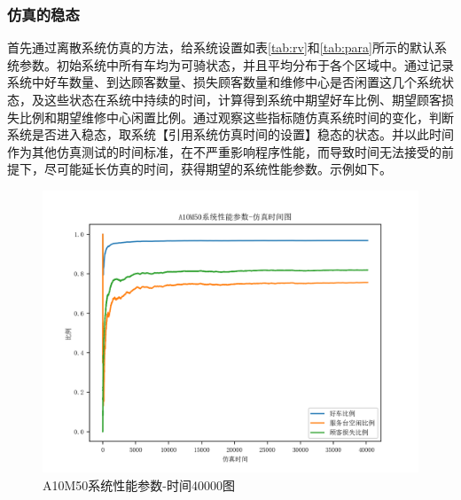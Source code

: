 \documentclass{article}
\begin{document}
\subsubsection{仿真的稳态}
首先通过离散系统仿真的方法，给系统设置如表\ref{tab:rv}和\ref{tab:para}所示的默认系统参数。初始系统中所有车均为可骑状态，并且平均分布于各个区域中。通过记录系统中好车数量、到达顾客数量、损失顾客数量和维修中心是否闲置这几个系统状态，及这些状态在系统中持续的时间，计算得到系统中期望好车比例、期望顾客损失比例和期望维修中心闲置比例。通过观察这些指标随仿真系统时间的变化，判断系统是否进入稳态，取系统【引用系统仿真时间的设置】稳态的状态。并以此时间作为其他仿真测试的时间标准，在不严重影响程序性能，而导致时间无法接受的前提下，尽可能延长仿真的时间，获得期望的系统性能参数。示例如下。
\begin{figure}[H]
    \centering
    \includegraphics[scale=0.5]{sim/A10M50系统性能参数-时间40000图.png}
    \caption{A10M50系统性能参数-时间40000图}
    \label{fig:cenmodel}
\end{figure}
\end{document}
